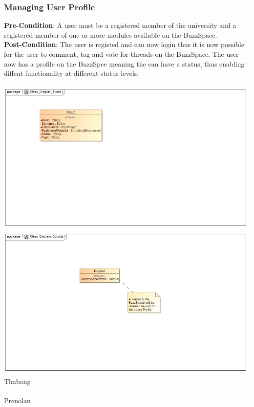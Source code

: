 \documentclass[a4paper,11pt]{article}
\begin{document}
\subsubsection{Managing User Profile}
\textbf{Pre-Condition}: A user must be a registered member of the university and a registered member of one or more modules available on the BuzzSpace.
\\
\textbf{Post-Condition}: The user is registed and can now login thus it is now possible for the user to comment, tag and vote for threads on the BuzzSpace. The user now has a profile on the BuzzSpce meaning the can have a status, thus enabling diffent functionality at different status levels.
\\
\\
\includegraphics{Images/ManageUserProfile/Class_Diagram_Inputs}
\includegraphics{Images/ManageUserProfile/Class_Diagram_Outputs}
\\

Thabang\\
\\

Prenolan
\end{document}
